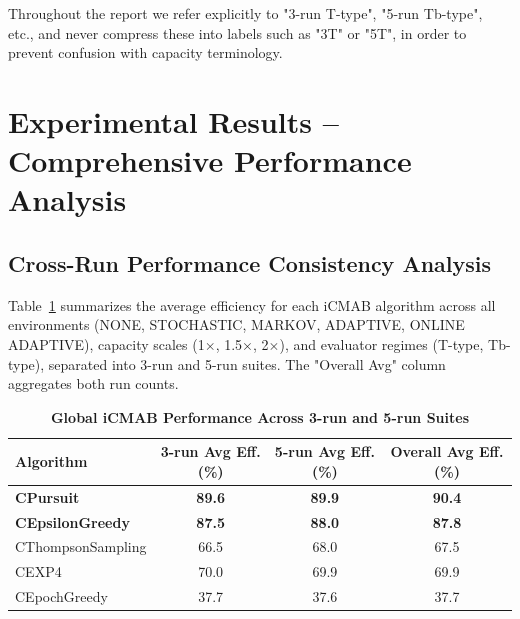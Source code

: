 \documentclass[12pt,a4paper]{article}
\newcommand{\performance}[1]{\textcolor{performancecolor}{\textbf{#1}}}
\begin{document}
Throughout the report we refer explicitly to "3-run T-type", "5-run Tb-type", etc., and never compress these into labels such as "3T" or "5T", in order to prevent confusion with capacity terminology.

\newpage
\section{Experimental Results – Comprehensive Performance Analysis}

\begin{tcolorbox}[colback=performancecolor!10,colframe=performancecolor,title=\textbf{Primary Performance Results (Aggregated Across Capacities, Environments, and Regimes)}]

\subsection{Cross-Run Performance Consistency Analysis}

Table~\ref{tab:global-performance} summarizes the average efficiency for each iCMAB algorithm across all environments (NONE, STOCHASTIC, MARKOV, ADAPTIVE, ONLINE ADAPTIVE), capacity scales (1$\times$, 1.5$\times$, 2$\times$), and evaluator regimes (T-type, Tb-type), separated into 3-run and 5-run suites. The "Overall Avg" column aggregates both run counts.

\begin{table}[H]
\centering
\caption{\performance{Global iCMAB Performance Across 3-run and 5-run Suites}}
\label{tab:global-performance}
\begin{tabular}{|l|c|c|c|}
\hline
\textbf{Algorithm} & \textbf{3-run Avg Eff. (\%)} & \textbf{5-run Avg Eff. (\%)} & \textbf{Overall Avg Eff. (\%)} \\
\hline
\hline
\performance{CPursuit}        & \performance{89.6} & \performance{89.9} & \performance{\textbf{90.4}} \\
\performance{CEpsilonGreedy} & \performance{87.5} & \performance{88.0} & \performance{\textbf{87.8}} \\
CThompsonSampling            & 66.5              & 68.0              & 67.5 \\
CEXP4                        & 70.0              & 69.9              & 69.9 \\
CEpochGreedy                 & 37.7              & 37.6              & 37.7 \\
\hline
\end{tabular}
\end{table}


\end{tcolorbox}
\end{document}
